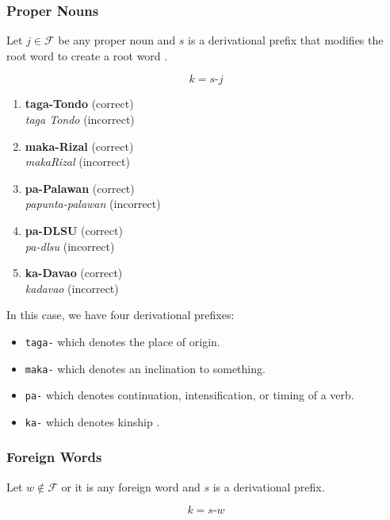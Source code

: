 \subsubsection{Proper Nouns}
\label{proper_nouns_chapter}
Let $j \in \mathcal{F}$ be any proper noun and $s$ is a derivational prefix that modifies the root word to create a root word \cite{rafael2018}.

\[
      k = s\texttt{-}j
\]

\begin{example}
\end{example}
\begin{enumerate}
      \item \textbf{taga-Tondo} (correct) \\
            \textit{taga Tondo} (incorrect)
      \item \textbf{maka-Rizal} (correct) \\
            \textit{makaRizal} (incorrect)
      \item \textbf{pa-Palawan} (correct) \\
            \textit{papunta-palawan} (incorrect)
      \item \textbf{pa-DLSU} (correct) \\
            \textit{pa-dlsu} (incorrect)
      \item \textbf{ka-Davao} (correct) \\
            \textit{kadavao} (incorrect)
\end{enumerate}

In this case, we have four derivational prefixes:
\begin{itemize}
    \item \texttt{taga-} which denotes the place of origin.
    \item \texttt{maka-} which denotes an inclination to something.
    \item \texttt{pa-} which denotes continuation, intensification, or timing of a verb.
    \item \texttt{ka-} which denotes kinship .
\end{itemize}

\subsubsection{Foreign Words}
Let \(w \notin \mathcal{F}\) or it is any foreign word and $s$ is a derivational prefix.

\[
      k = s\texttt{-}w
\]

